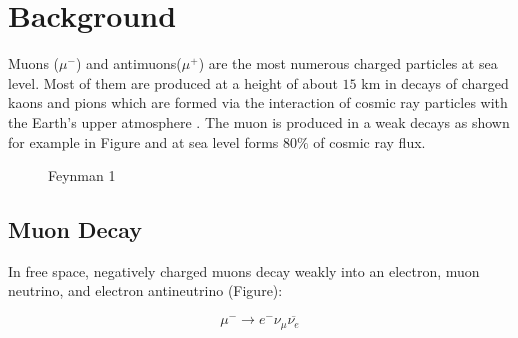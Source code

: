 
\section{Background}

Muons ($\mu^-$) and antimuons($\mu^+$) are the most numerous charged
particles at sea level\cite{pdg}. Most of them are produced at a
height of about $15$ km in decays of charged kaons and pions which are
formed via the interaction of cosmic ray particles with the Earth's
upper atmosphere \cite{amsler}. The muon is produced in a weak decays
as shown for example in Figure and at sea level forms $80\%$ of cosmic
ray flux.


\begin{center}
\begin{figure}[h]
\caption{Feynman 1}
\label{figure:feyn2}
\end{figure}
\end{center}


\subsection{Muon Decay}

In free space, negatively charged muons decay weakly into an electron,
muon neutrino, and electron antineutrino \cite{easwar} (Figure):

\begin{equation}\mu^- \rightarrow e^- \nu_{\mu}\overline{\nu_e}\label{mudecay}\end{equation}

